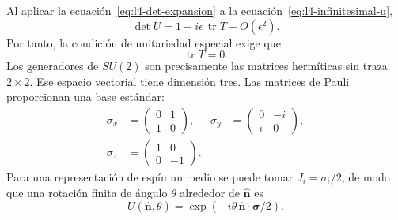 Al aplicar la ecuación~\eqref{eq:l4-det-expansion} a la ecuación~\eqref{eq:l4-infinitesimal-u},
\begin{equation}
\det U
=1+i\epsilon\,\operatorname{tr}T+O(\epsilon^2).
\end{equation}
Por tanto, la condición de unitariedad especial exige que
\begin{equation}
\operatorname{tr}T=0.
\label{eq:l4-traceless-generator}
\end{equation}
Los generadores de \(SU(2)\) son precisamente las matrices hermíticas sin traza \(2\times2\). Ese espacio vectorial tiene dimensión tres. Las matrices de Pauli proporcionan una base estándar:
\begin{equation}
\begin{aligned}
\sigma_x&=
\begin{pmatrix}0&1\\1&0\end{pmatrix},
&
\sigma_y&=
\begin{pmatrix}0&-i\\i&0\end{pmatrix},
\\[0.4em]
\sigma_z&=
\begin{pmatrix}1&0\\0&-1\end{pmatrix}.
\end{aligned}
\end{equation}
Para una representación de espín un medio se puede tomar \(J_i=\sigma_i/2\), de modo que una rotación finita de ángulo \(\theta\) alrededor de \(\hat{\boldsymbol n}\) es
\begin{equation}
U(\hat{\boldsymbol n},\theta)
=\exp\!\left(-i\theta\,
\hat{\boldsymbol n}\cdot\boldsymbol\sigma/2\right).
\end{equation}

\begin{classroomqa}
\end{classroomqa}

